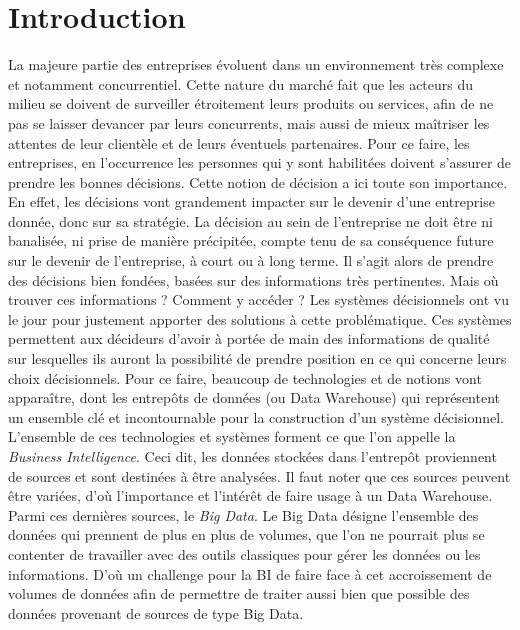 \documentclass[12pt,a4wide,twoside]{report}
\begin{document}
\chapter*{Introduction}
La majeure partie des entreprises évoluent dans un environnement très complexe et notamment concurrentiel. Cette nature du marché fait que les acteurs du milieu se doivent de surveiller étroitement leurs produits ou services, afin de ne pas se laisser devancer par leurs concurrents, mais aussi de mieux maîtriser les attentes de leur clientèle et de leurs éventuels partenaires. \newline
Pour ce faire, les entreprises, en l'occurrence les personnes qui y sont habilitées doivent s'assurer de prendre les bonnes décisions. Cette notion de décision a ici toute son importance. En effet, les décisions vont grandement impacter sur le devenir d'une entreprise donnée, donc sur sa stratégie.\newline
La décision au sein de l'entreprise ne doit être ni banalisée, ni prise de manière précipitée, compte tenu de sa conséquence future sur le devenir de l'entreprise, à court ou à long terme. Il s'agit alors de prendre des décisions bien fondées, basées sur des informations très pertinentes.\newline
Mais où trouver ces informations ? Comment y accéder ?\newline
Les systèmes décisionnels ont vu le jour pour justement apporter des solutions à cette problématique. Ces systèmes permettent aux décideurs d'avoir à portée de main des informations de qualité sur lesquelles ils auront la possibilité de prendre position en ce qui concerne leurs choix décisionnels. Pour ce faire, beaucoup de technologies et de notions vont apparaître, dont les entrepôts de données (ou Data Warehouse) qui représentent un ensemble clé et incontournable pour la construction d'un système décisionnel. L'ensemble de ces technologies et systèmes forment ce que l'on appelle la \emph{Business Intelligence}.\newline
Ceci dit, les données stockées dans l'entrepôt proviennent de sources et sont destinées à être analysées. Il faut noter que ces sources peuvent être variées, d'où l'importance et l'intérêt de faire usage à un Data Warehouse. Parmi ces dernières sources, le \emph{Big Data}.\newline
Le Big Data désigne l'ensemble des données qui prennent de plus en plus de volumes, que l'on ne pourrait plus se contenter de travailler avec des outils classiques pour gérer les données ou les informations. D'où un challenge pour la BI de faire face à cet accroissement de volumes de données afin de permettre de traiter aussi bien que possible des données provenant de sources de type Big Data.\newline
\end{document}
